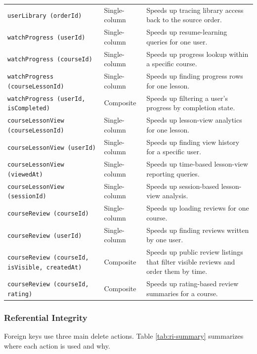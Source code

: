 \begin{longtable}{L{4.3cm}L{2.6cm}L{6.3cm}}
\texttt{userLibrary (orderId)} & Single-column & Speeds up tracing library access back to the source order. \\
\texttt{watchProgress (userId)} & Single-column & Speeds up resume-learning queries for one user. \\
\texttt{watchProgress (courseId)} & Single-column & Speeds up progress lookup within a specific course. \\
\texttt{watchProgress (courseLessonId)} & Single-column & Speeds up finding progress rows for one lesson. \\
\texttt{watchProgress (userId, isCompleted)} & Composite & Speeds up filtering a user’s progress by completion state. \\
\texttt{courseLessonView (courseLessonId)} & Single-column & Speeds up lesson-view analytics for one lesson. \\
\texttt{courseLessonView (userId)} & Single-column & Speeds up finding view history for a specific user. \\
\texttt{courseLessonView (viewedAt)} & Single-column & Speeds up time-based lesson-view reporting queries. \\
\texttt{courseLessonView (sessionId)} & Single-column & Speeds up session-based lesson-view analysis. \\
\texttt{courseReview (courseId)} & Single-column & Speeds up loading reviews for one course. \\
\texttt{courseReview (userId)} & Single-column & Speeds up finding reviews written by one user. \\
\texttt{courseReview (courseId, isVisible, createdAt)} & Composite & Speeds up public review listings that filter visible reviews and order them by time. \\
\texttt{courseReview (courseId, rating)} & Composite & Speeds up rating-based review summaries for a course. \\
\end{longtable}
\endgroup

\subsubsection{Referential Integrity}

\noindent
Foreign keys use three main delete actions. Table \ref{tab:ri-summary} summarizes where each action is used and why.

